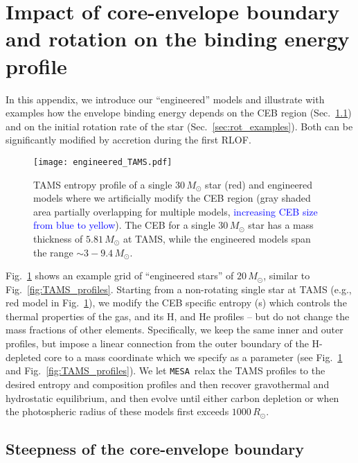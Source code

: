 \documentclass[twocolumn,twocolappendix,trackchanges]{aastex63}
\newcommand{\code}[1]{\texttt{#1}}
\newcommand{\mesa}{\code{MESA}}
\DeclareRobustCommand{\Figref}[1]{Fig.~\ref{#1}}
\DeclareRobustCommand{\Secref}[1]{Sec.~\ref{#1}}
\begin{document}



\appendix
\section{Impact of core-envelope boundary and rotation on the binding  energy profile}
\label{sec:toy_models}

In this appendix, we introduce our ``engineered'' models and
illustrate with examples how the
envelope binding energy depends on the CEB
region
(\Secref{sec:eng_examples}) and on the initial rotation rate of the
star (\Secref{sec:rot_examples}). Both can be significantly modified
by accretion during the first RLOF.

\begin{figure}[hbtp]
  \texttt{[image: engineered\_TAMS.pdf]}
  \caption{TAMS entropy profile of a single 30\,$M_\odot$ star (red)
    and engineered models where we artificially modify the CEB region
    (gray shaded area partially overlapping for multiple models,
    \textcolor{blue}{increasing CEB size from blue to yellow}). The
    CEB for a single $30\,M_\odot$ star has a mass thickness of
    $5.81\,M_\odot$ at TAMS, while the engineered models span the
    range $\sim3-9.4\,M_\odot$.}
  \label{fig:engineered_TAMS}
\end{figure}

\Figref{fig:engineered_TAMS} shows an example grid of ``engineered
stars'' of $20\,M_\odot$, similar to \Figref{fig:TAMS_profiles}.
Starting from a non-rotating single star at TAMS (e.g., red model in
\Figref{fig:engineered_TAMS}), we modify the CEB specific entropy (s)
which controls the thermal properties of the gas, and its H, and He
profiles -- but do not change the mass fractions of other elements.
Specifically, we keep the same inner and outer profiles, but impose a
linear connection from the outer boundary of the H-depleted core to a
mass coordinate which we specify as a parameter (see
\Figref{fig:engineered_TAMS} and \Figref{fig:TAMS_profiles}). We let \mesa\ relax
the TAMS profiles to the desired entropy and composition profiles and
then recover gravothermal and hydrostatic equilibrium, and then evolve
until either carbon depletion or when the photospheric radius of these
models first exceeds
$1000\,R_\odot$.

\subsection{Steepness of the core-envelope boundary}
\label{sec:eng_examples}
\end{document}

